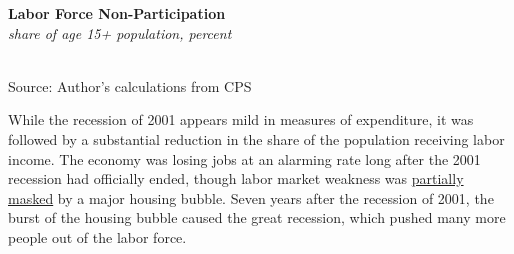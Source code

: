 \documentclass{report}
\newcommand{\barylab}[2]{yticklabel style={text width=#1, align=right, 
		style={black!70}, text height=#2},}
\newcommand{\bbar}[2]{extra #1 ticks = {{#2}}, extra #1 tick labels = ,
		extra #1 tick style = {grid=major, grid style={thick, black!25}},}
\newcommand{\barplotnogrid}{xbar=0pt, axis line style={draw=none},
	    yticklabel style={align=left, anchor=east},
      		xmajorticks=false, ymajorgrids=false,   
	    ytick=data, tickwidth=0pt, area legend, reverse legend,
	    nodes near coords, nodes near coords align={horizontal},}
\begin{document}
{{\begin{minipage}{0.38\textwidth}
\normalsize \textbf{Labor Force Non-Participation}\\
\footnotesize{\textit{share of age 15+ population, percent}}\\
\hspace*{-4mm} \\
\footnotesize{Source: Author's calculations from CPS}
\end{minipage} \hspace{4mm}
\begin{minipage}{0.34\textwidth}
\small 
\end{minipage}

\begin{minipage}{0.76\textwidth}
\small While the recession of 2001 appears mild in measures of expenditure, it was followed by a substantial reduction in the share of the population receiving labor income. The economy was losing jobs at an alarming rate long after the 2001 recession had officially ended, though labor market weakness was \href{https://www.aeaweb.org/articles?id=10.1257/jep.30.2.179}{partially masked} by a major housing bubble. Seven years after the recession of 2001, the burst of the housing bubble caused the great recession, which pushed many more people out of the labor force.
\end{minipage}

}}
\end{document}
